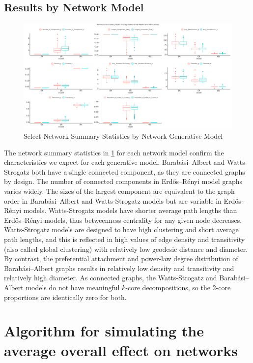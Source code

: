 \documentclass{article}
\theoremstyle{definition}
\begin{document}
\subsection{Results by Network Model}
\begin{figure}[H]
    \centering
    \includegraphics[width=\linewidth]{Corrected Figures/Network Summary Statistics.png}
    \caption{Select Network Summary Statistics by Network Generative Model}
    \label{fig:Figure B1}
\end{figure}

The network summary statistics in \ref{fig:Figure B1} for each network model confirm the characteristics we expect for each generative model. Barabási–Albert and Watts-Strogatz both have a single connected component, as they are connected graphs by design. The number of connected components in Erdős–Rényi model graphs varies widely. The sizes of the largest component are equivalent to the graph order in Barabási–Albert  and Watts-Strogatz models but are variable in Erdős–Rényi models. Watts-Strogatz models have shorter average path lengths than Erdős–Rényi models, thus betweenness centrality for any given node decreases. Watts-Strogatz models are designed to have high clustering and short average path lengths, and this is reflected in high values of edge density and transitivity (also called global clustering) with relatively low geodesic distance and diameter. By contrast, the preferential attachment and power-law degree distribution of Barabási–Albert graphs results in relatively low density and transitivity and relatively high diameter. As connected graphs, the Watts-Strogatz and Barabási–Albert models do not have meaningful $k$-core decompositions, so the 2-core proportions are identically zero for both.



\section{\textbf{Algorithm for simulating the average overall effect on networks}}
\label{Appendix 3}
\end{document}
